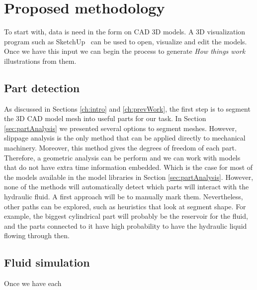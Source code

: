 \chapter{Proposed methodology}

To start with, data is need in the form on CAD 3D models.
A 3D visualization program such as SketchUp~\cite{Trimble2014} can be used to open, visualize and edit the models.
Once we have this input we can begin the process to generate \textit{How things work} illustrations from them.


\section{Part detection}

As discussed in Sections \ref{ch:intro} and \ref{ch:prevWork}, the first step is to segment the 3D CAD model mesh into useful parts for our task.
In Section \ref{sec:partAnalysis} we presented several options to segment meshes.
However, slippage analysis is the only method that can be applied directly to mechanical machinery.
Moreover, this method gives the degrees of freedom of each part. Therefore, a geometric analysis can be perform and we can work with models that do not have extra time information embedded.
Which is the case for most of the models available in the model libraries in Section \ref{sec:partAnalysis}.
However, none of the methods will automatically detect which parts will interact with the hydraulic fluid.
A first approach will be to manually mark them.
Nevertheless, other paths can be explored, such as heuristics that look at segment shape.
For example, the biggest cylindrical part will probably be the reservoir for the fluid, and the parts connected to it have high probability to have the hydraulic liquid flowing through then.


\section{Fluid simulation}

Once we have each

